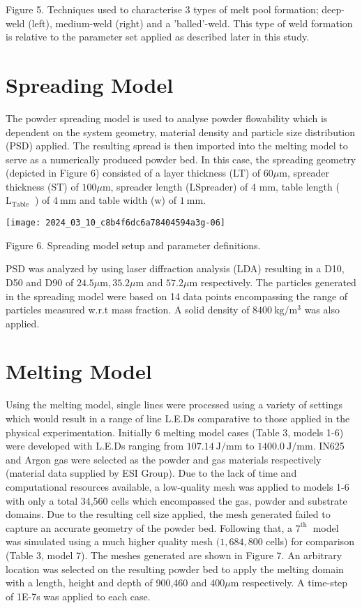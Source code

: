 \documentclass[10pt]{article}
\begin{document}
Figure 5. Techniques used to characterise 3 types of melt pool formation; deep-weld (left), medium-weld (right) and a 'balled'-weld. This type of weld formation is relative to the parameter set applied as described later in this study.

\section*{Spreading Model}
The powder spreading model is used to analyse powder flowability which is dependent on the system geometry, material density and particle size distribution (PSD) applied. The resulting spread is then imported into the melting model to serve as a numerically produced powder bed. In this case, the spreading geometry (depicted in Figure 6) consisted of a layer thickness (LT) of $60 \mu \mathrm{m}$, spreader thickness (ST) of $100 \mu \mathrm{m}$, spreader length (LSpreader) of 4 $\mathrm{mm}$, table length ( $\mathrm{L}_{\text {Table }}$ ) of $4 \mathrm{~mm}$ and table width (w) of $1 \mathrm{~mm}$.

\begin{center}
\texttt{[image: 2024\_03\_10\_c8b4f6dc6a78404594a3g-06]}
\end{center}

Figure 6. Spreading model setup and parameter definitions.

PSD was analyzed by using laser diffraction analysis (LDA) resulting in a D10, D50 and D90 of $24.5 \mu \mathrm{m}, 35.2 \mu \mathrm{m}$ and $57.2 \mu \mathrm{m}$ respectively. The particles generated in the spreading model were based on 14 data points encompassing the range of particles measured w.r.t mass fraction. A solid density of $8400 \mathrm{~kg} / \mathrm{m}^{3}$ was also applied.

\section*{Melting Model}
Using the melting model, single lines were processed using a variety of settings which would result in a range of line L.E.Ds comparative to those applied in the physical experimentation. Initially 6 melting model cases (Table 3, models 1-6) were developed with L.E.Ds ranging from $107.14 \mathrm{~J} / \mathrm{mm}$ to $1400.0 \mathrm{~J} / \mathrm{mm}$. IN625 and Argon gas were selected as the powder and gas materials respectively (material data supplied by ESI Group). Due to the lack of time and computational resources available, a low-quality mesh was applied to models 1-6 with only a total 34,560 cells which encompassed the gas, powder and substrate domains. Due to the resulting cell size applied, the mesh generated failed to capture an accurate geometry of the powder bed. Following that, a $7^{\text {th }}$ model was simulated using a much higher quality mesh $(1,684,800$ cells) for comparison (Table 3, model 7). The meshes generated are shown in Figure 7. An arbitrary location was selected on the resulting powder bed to apply the melting domain with a length, height and depth of 900,460 and $400 \mu \mathrm{m}$ respectively. A time-step of 1E-7s was applied to each case.
\end{document}
